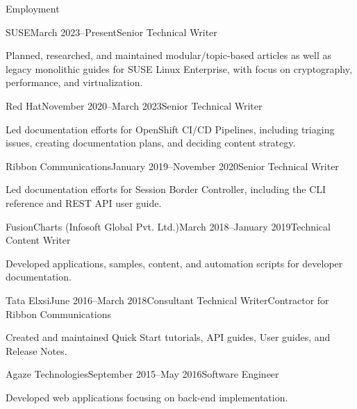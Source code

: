 \documentclass{resume} %
\begin{document}
\begin{rSection}{Employment}

\begin{rSubsection}{SUSE}{March 2023--Present}{Senior Technical Writer}{}
\item Planned, researched, and maintained modular/topic-based articles as well as legacy monolithic guides for SUSE Linux Enterprise, with focus on cryptography, performance, and virtualization. 
\end{rSubsection}


\begin{rSubsection}{Red Hat}{November 2020--March 2023}{Senior Technical Writer}{}
\item Led documentation efforts for OpenShift CI/CD Pipelines, including triaging issues, creating documentation plans, and deciding content strategy.   
\end{rSubsection}

\begin{rSubsection}{Ribbon Communications}{January 2019--November 2020}{Senior Technical Writer}{}
\item Led documentation efforts for Session Border Controller, including the CLI reference and REST API user guide.
\end{rSubsection}


\begin{rSubsection}{FusionCharts (Infosoft Global Pvt. Ltd.)}{March 2018--January 2019}{Technical Content Writer}{}
\item Developed applications, samples, content, and automation scripts for developer documentation.
\end{rSubsection}


\begin{rSubsection}{Tata Elxsi}{June 2016--March 2018}{Consultant Technical Writer}{Contractor for Ribbon Communications}
\item Created and maintained Quick Start tutorials, API guides, User guides, and Release Notes.
\end{rSubsection}


\begin{rSubsection}{Agaze Technologies}{September 2015--May 2016}{Software Engineer}{}
\item Developed web applications focusing on back-end implementation.
\end{rSubsection}


\end{rSection}
\end{document}
